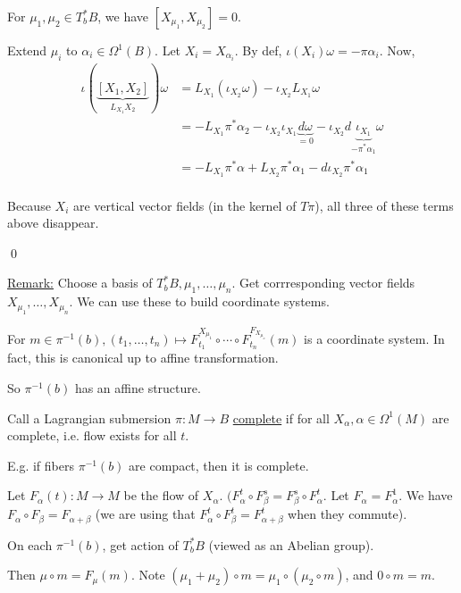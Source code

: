 \documentclass[x11names,reqno,14pt]{extarticle}
\begin{document}
\prop

For $\mu_1,\mu_2 \in T_b^*B$, we have $[X_{\mu_1},X_{\mu_2}] = 0$.

\proof

Extend $\mu_i$ to $\alpha_i\in\Omega^1(B)$. Let $X_i = X_{\alpha_i}$. By def, $\iota(X_i)\omega = -\pi\alpha_i$. 
Now, 
\begin{align*}
\iota(\underbrace{[X_1,X_2]}_{L_{X_1}X_2})\omega & = L_{X_1}(\iota_{X_2}\omega) - \iota_{X_2}L_{X_1}\omega \\
& = - L_{X_1}\pi^*\alpha_2 - \iota_{X_2}\iota_{X_1}\underbrace{d\omega}_{=0} - \iota_{X_2}d\underbrace{\iota_{X_1}}_{-\pi^*\alpha_1}\omega \\
& = -L_{X_1}\pi^*\alpha + L_{X_2}\pi^*\alpha_1 - d\iota_{X_2}\pi^*\alpha_1 \\
\end{align*}

Because $X_i$ are vertical vector fields (in the kernel of $T\pi$), all three of these terms above disappear.

\qed

\underline{Remark:} Choose a basis of $T_b^*B, \mu_1,\dots,\mu_n$. Get corrresponding vector fields $X_{\mu_1},\dots,X_{\mu_n}$. We can use these to build coordinate systems. 

For $m \in \pi^{-1}(b), (t_1,\dots,t_n) \mapsto F_{t_1}^{X_{\mu_1}}\circ\cdots\circ F_{t_n}^{F_{X_{\mu_n}}}(m)$ is a coordinate system. In fact, this is canonical up to affine transformation. 

So $\pi^{-1}(b)$ has an affine structure. 


Call a Lagrangian submersion $\pi:M\to B$ \underline{complete} if for all $X_\alpha, \alpha\in\Omega^1(M)$ are complete, i.e. flow exists for all $t$. 

E.g. if fibers $\pi^{-1}(b)$ are compact, then it is complete. 

Let $F_\alpha(t):M\to M$ be the flow of $X_\alpha$. $(F_\alpha^t\circ F_\beta^s = F_{\beta}^s\circ F_\alpha^t$. Let $F_\alpha = F_\alpha^1$. We have $F_\alpha\circ F_\beta = F_{\alpha + \beta}$ (we are using that $F_\alpha^t \circ F_\beta^t = F_{\alpha+\beta}^t$ when they commute). 

On each $\pi^{-1}(b)$, get action of $T_b^*B$ (viewed as an Abelian group).

Then $\mu\circ m = F_\mu(m)$. Note $(\mu_1 + \mu_2)\circ m = \mu_1\circ(\mu_2\circ m)$, and $0\circ m = m$. 

\prop
\end{document}
